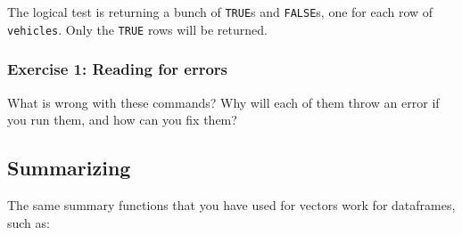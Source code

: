 \documentclass[
]{book}
\newenvironment{Shaded}{\begin{snugshade}}{\end{snugshade}}
\newcommand{\CommentTok}[1]{\textcolor[rgb]{0.56,0.35,0.01}{\textit{#1}}}
\newcommand{\DecValTok}[1]{\textcolor[rgb]{0.00,0.00,0.81}{#1}}
\newcommand{\FloatTok}[1]{\textcolor[rgb]{0.00,0.00,0.81}{#1}}
\newcommand{\KeywordTok}[1]{\textcolor[rgb]{0.13,0.29,0.53}{\textbf{#1}}}
\newcommand{\NormalTok}[1]{#1}
\newcommand{\OperatorTok}[1]{\textcolor[rgb]{0.81,0.36,0.00}{\textbf{#1}}}
\newcommand{\StringTok}[1]{\textcolor[rgb]{0.31,0.60,0.02}{#1}}
\begin{document}
The logical test is returning a bunch of \texttt{TRUE}s and \texttt{FALSE}s, one for each row of \texttt{vehicles}. Only the \texttt{TRUE} rows will be returned.

\hypertarget{exercise-1-reading-for-errors}{%
\subsubsection*{Exercise 1: Reading for errors}\label{exercise-1-reading-for-errors}}

What is wrong with these commands? Why will each of them throw an error if you run them, and how can you fix them?

\begin{Shaded}
\end{Shaded}

\hypertarget{summarizing}{%
\subsection*{Summarizing}\label{summarizing}}

The same summary functions that you have used for vectors work for dataframes, such as:

\begin{Shaded}
\end{Shaded}
\end{document}
